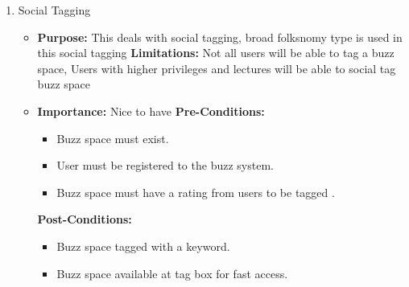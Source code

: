 \documentclass[11pt]{article}
\begin{document}
\begin{enumerate}
				















\item Social Tagging 
\begin{itemize}
\item \textbf{Purpose:}
This deals with social tagging, broad folksnomy type is used
in this social tagging
\newline
\textbf{Limitations:} 
Not all users will be able to tag a buzz
space, Users with higher privileges and lectures will be able to social
tag buzz space

\item \textbf{Importance:} Nice to have\newline
\textbf{Pre-Conditions: }
	\begin{itemize}
	\item Buzz space must exist.
	\item User must be registered to the buzz system.
	\item Buzz space must have a rating from users to be tagged .
	\end{itemize}

\textbf{Post-Conditions: }
	\begin{itemize}
	\item Buzz space tagged with a keyword.
	\item Buzz space available at tag box for fast access.
	\end{itemize}
\end{itemize}


\end{enumerate}
\end{document}
